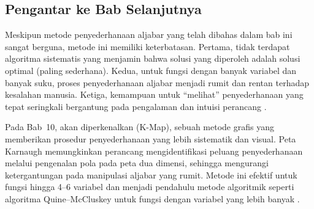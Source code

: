 \subsection{Pengantar ke Bab Selanjutnya}

Meskipun metode penyederhanaan aljabar yang telah dibahas dalam bab ini sangat berguna, metode ini memiliki keterbatasan. Pertama, tidak terdapat algoritma sistematis yang menjamin bahwa solusi yang diperoleh adalah solusi optimal (paling sederhana). Kedua, untuk fungsi dengan banyak variabel dan banyak suku, proses penyederhanaan aljabar menjadi rumit dan rentan terhadap kesalahan manusia. Ketiga, kemampuan untuk ``melihat'' penyederhanaan yang tepat seringkali bergantung pada pengalaman dan intuisi perancang \cite{allaboutcircuits_boolean}.

Pada Bab~10, akan diperkenalkan  (K-Map), sebuah metode grafis yang memberikan prosedur penyederhanaan yang lebih sistematik dan visual. Peta Karnaugh memungkinkan perancang mengidentifikasi peluang penyederhanaan melalui pengenalan pola pada peta dua dimensi, sehingga mengurangi ketergantungan pada manipulasi aljabar yang rumit. Metode ini efektif untuk fungsi hingga 4--6 variabel dan menjadi pendahulu metode algoritmik seperti algoritma Quine--McCluskey untuk fungsi dengan variabel yang lebih banyak \cite{wiki_karnaugh}.
